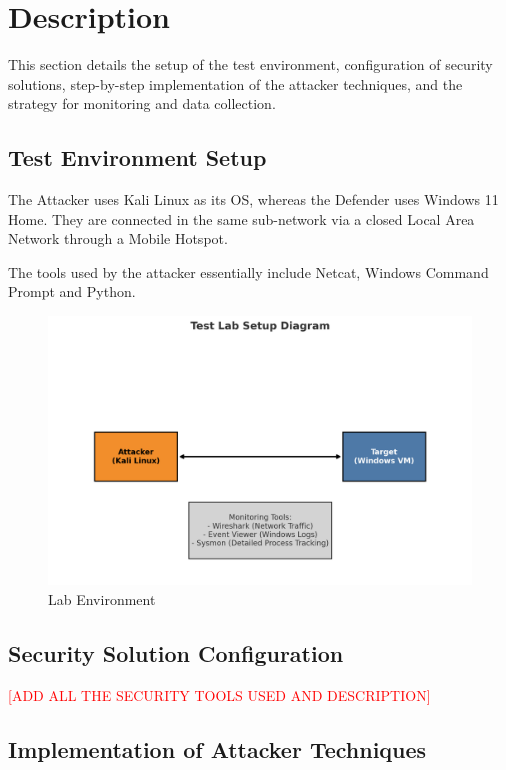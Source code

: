\documentclass[11pt]{article}
\begin{document}
		\section{Description}
			This section details the setup of the test environment, configuration of security solutions, step-by-step implementation of the attacker techniques, and the strategy for monitoring and data collection.
		
			\subsection{Test Environment Setup}
				The Attacker uses Kali Linux as its OS, whereas the Defender uses Windows 11 Home. They are connected in the same sub-network via a closed Local Area Network through a Mobile Hotspot.\par
				The tools used by the attacker essentially include Netcat, Windows Command Prompt and Python.
				\begin{figure}[H]
					\centering
					\includegraphics[width=1\linewidth]{Pictures/test_lab_env}
					\caption{Lab Environment}
					\label{fig:testlabenv}
				\end{figure}
				
			\subsection{Security Solution Configuration}
				\textcolor{red}{[ADD ALL THE SECURITY TOOLS USED AND DESCRIPTION]}
				
			\subsection{Implementation of Attacker Techniques}
\end{document}
